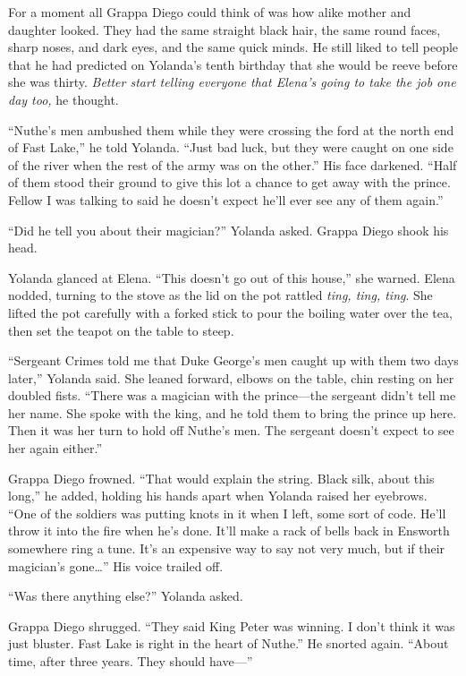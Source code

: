 \documentclass[10pt]{book}
\begin{document}
For a moment all Grappa Diego could think of was how alike mother and daughter looked. They had the same straight black hair, the same round faces, sharp noses, and dark eyes, and the same quick minds. He still liked to tell people that he had predicted on Yolanda's tenth birthday that she would be reeve before she was thirty. \emph{Better start telling everyone that Elena's going to take the job one day too,} he thought.

``Nuthe's men ambushed them while they were crossing the ford at the north end of Fast Lake,'' he told Yolanda. ``Just bad luck, but they were caught on one side of the river when the rest of the army was on the other.'' His face darkened. ``Half of them stood their ground to give this lot a chance to get away with the prince. Fellow I was talking to said he doesn't expect he'll ever see any of them again.''

``Did he tell you about their magician?'' Yolanda asked. Grappa Diego shook his head.

Yolanda glanced at Elena. ``This doesn't go out of this house,'' she warned. Elena nodded, turning to the stove as the lid on the pot rattled \emph{ting, ting, ting}. She lifted the pot carefully with a forked stick to pour the boiling water over the tea, then set the teapot on the table to steep.

``Sergeant Crimes told me that Duke George's men caught up with them two days later,'' Yolanda said. She leaned forward, elbows on the table, chin resting on her doubled fists. ``There was a magician with the prince---the sergeant didn't tell me her name. She spoke with the king, and he told them to bring the prince up here. Then it was her turn to hold off Nuthe's men. The sergeant doesn't expect to see her again either.''

Grappa Diego frowned. ``That would explain the string. Black silk, about this long,'' he added, holding his hands apart when Yolanda raised her eyebrows. ``One of the soldiers was putting knots in it when I left, some sort of code. He'll throw it into the fire when he's done. It'll make a rack of bells back in Ensworth somewhere ring a tune. It's an expensive way to say not very much, but if their magician's gone{\ldots}'' His voice trailed off.

``Was there anything else?'' Yolanda asked.

Grappa Diego shrugged. ``They said King Peter was winning. I don't think it was just bluster. Fast Lake is right in the heart of Nuthe.'' He snorted again. ``About time, after three years. They should have---''
\end{document}
